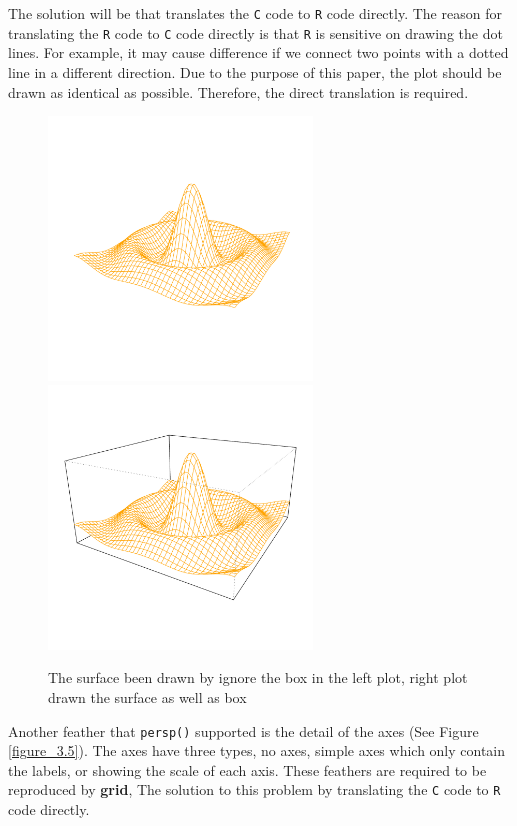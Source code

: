 \documentclass[11pt,twoside]{report}
\begin{document}
The solution will be that translates the \texttt{C} code to \texttt{R} code directly. The reason for translating the \texttt{R} code to \texttt{C} code directly is that \texttt{R} is sensitive on drawing the dot lines. For example, it may cause difference if we connect two points with a dotted line in a different direction. Due to the purpose of this paper, the plot should be drawn as identical as possible. Therefore, the direct translation is required.\\
\begin{figure}[h]
	\begin{center}
		\includegraphics[height = 7cm, width = 7cm]{figure/box_example_1.pdf}
		\includegraphics[height = 7cm, width = 7cm]{figure/box_example_2.pdf}
		\caption{The surface been drawn by ignore the box in the left plot, right plot drawn the surface as well as box}
		\label{figure_3.4}
	\end{center}
\end{figure}

Another feather that \texttt{persp()} supported is the detail of the axes (See Figure \ref{figure_3.5}). The axes have three types, no axes, simple axes which only contain the labels, or showing the scale of each axis. These feathers are required to be reproduced by \textbf{grid}, The solution to this problem by translating the \texttt{C} code to \texttt{R} code directly.
\end{document}
